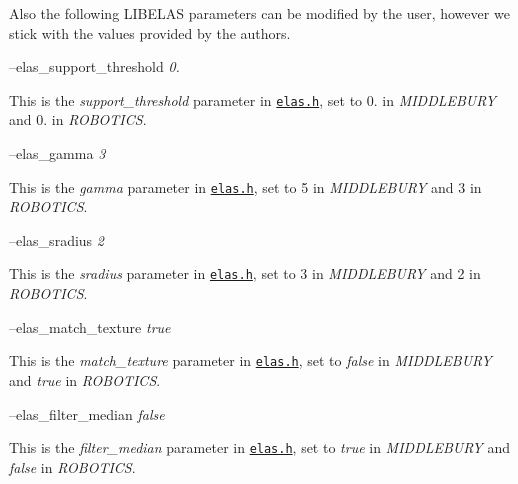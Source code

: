Also the following L\+I\+B\+E\+L\+AS parameters can be modified by the user, however we stick with the values provided by the authors.

--elas\+\_\+support\+\_\+threshold {\itshape 0.} 
\begin{DoxyItemize}
\item This is the {\itshape support\+\_\+threshold} parameter in \href{https://github.com/robotology/stereo-vision/tree/master/lib/elas/include/elas.h}{\tt elas.\+h}, set to 0. in {\itshape M\+I\+D\+D\+L\+E\+B\+U\+RY} and 0. in {\itshape R\+O\+B\+O\+T\+I\+CS}.
\end{DoxyItemize}

--elas\+\_\+gamma {\itshape 3} 
\begin{DoxyItemize}
\item This is the {\itshape gamma} parameter in \href{https://github.com/robotology/stereo-vision/tree/master/lib/elas/include/elas.h}{\tt elas.\+h}, set to 5 in {\itshape M\+I\+D\+D\+L\+E\+B\+U\+RY} and 3 in {\itshape R\+O\+B\+O\+T\+I\+CS}.
\end{DoxyItemize}

--elas\+\_\+sradius {\itshape 2} 
\begin{DoxyItemize}
\item This is the {\itshape sradius} parameter in \href{https://github.com/robotology/stereo-vision/tree/master/lib/elas/include/elas.h}{\tt elas.\+h}, set to 3 in {\itshape M\+I\+D\+D\+L\+E\+B\+U\+RY} and 2 in {\itshape R\+O\+B\+O\+T\+I\+CS}.
\end{DoxyItemize}

--elas\+\_\+match\+\_\+texture {\itshape true} 
\begin{DoxyItemize}
\item This is the {\itshape match\+\_\+texture} parameter in \href{https://github.com/robotology/stereo-vision/tree/master/lib/elas/include/elas.h}{\tt elas.\+h}, set to {\itshape false} in {\itshape M\+I\+D\+D\+L\+E\+B\+U\+RY} and {\itshape true} in {\itshape R\+O\+B\+O\+T\+I\+CS}.
\end{DoxyItemize}

--elas\+\_\+filter\+\_\+median {\itshape false} 
\begin{DoxyItemize}
\item This is the {\itshape filter\+\_\+median} parameter in \href{https://github.com/robotology/stereo-vision/tree/master/lib/elas/include/elas.h}{\tt elas.\+h}, set to {\itshape true} in {\itshape M\+I\+D\+D\+L\+E\+B\+U\+RY} and {\itshape false} in {\itshape R\+O\+B\+O\+T\+I\+CS}.
\end{DoxyItemize}

